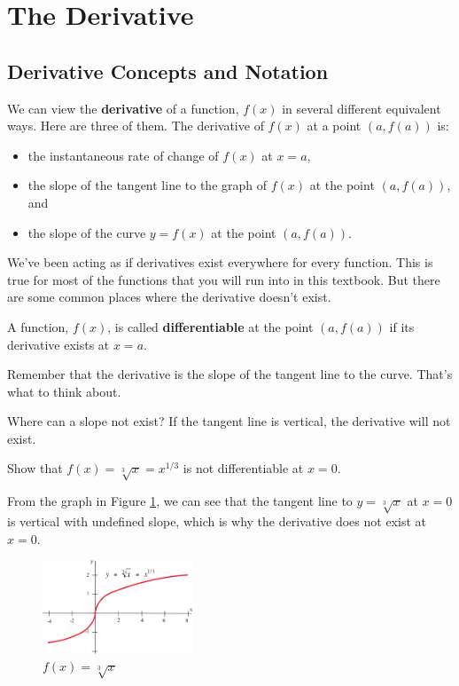 \section{The Derivative}
\label{sec:derivative}

\subsection{Derivative Concepts and Notation}

\begin{definition}
We can view the {\bf derivative} of a function, $f(x)$ in several different equivalent ways. Here are three of them. The derivative of $f(x)$ at a point $(a, f(a))$ is:
    \begin{itemize}
    \item the instantaneous rate of change of $f(x)$ at $x=a$, 
    \item the slope of the tangent line to the graph of $f(x)$ at the point $(a,f(a))$, and
    \item the slope of the curve $y=f(x)$ at the point $(a,f(a))$.
    \end{itemize}
\end{definition}

We've been acting as if derivatives exist everywhere for every function. This is true for most of the functions that you will run into in this textbook. But there are some common places where the derivative doesn't exist.

\begin{definition}
A function, $f(x)$, is called {\bf differentiable} at the point $(a,f(a))$ if its derivative exists at $x=a$.
\end{definition}

Remember that the derivative is the slope of the tangent line to the curve. That's what to think about.

Where can a slope not exist? If the tangent line is vertical, the derivative will not exist.

\begin{example}
Show that $f(x)=\sqrt[3]{x}=x^{1/3}$ is not differentiable at $x=0$.

\begin{solution} From the graph in Figure \ref{fig:2-3-cuberoot}, we can see that the tangent line to $y=\sqrt[3]{x}$ at $x=0$ is vertical with undefined slope, which is why the derivative does not exist at $x=0$.

\begin{figure}[!ht]
  \centering
    \includegraphics[width=0.4\textwidth]{img/chap2/image037.png}
    \caption{$f(x)=\sqrt[3]{x}$}
    \label{fig:2-3-cuberoot}
\end{figure}
\end{solution}\end{example}

